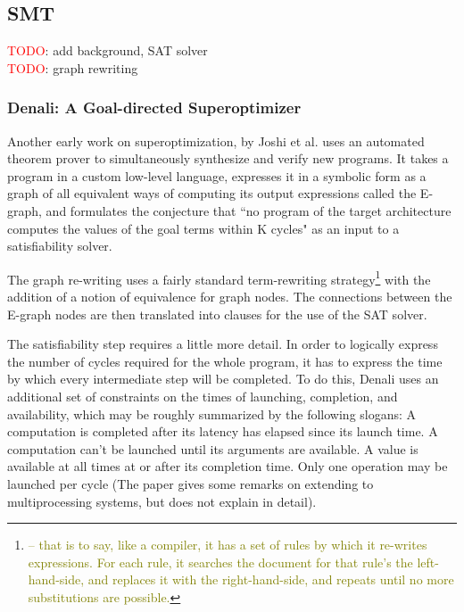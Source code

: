 \documentclass[12pt,twoside]{reedthesis}
\newcommand{\red}[1]{\textcolor{red}{#1}}
\newcommand{\green}[1]{\textcolor{olive}{#1}}
\newcommand{\addressed}[2]{{#1}}
\begin{document}
\subsection{SMT}
    \red{TODO}: add background, SAT solver
\\  \red{TODO}: graph rewriting

\subsubsection{Denali: A Goal-directed Superoptimizer}
Another early work on superoptimization, by Joshi et al. \cite{joshi2002denali} uses an automated theorem prover to simultaneously synthesize and verify new programs.
It takes a program in a custom low-level language, expresses it in a symbolic form as a graph of all equivalent ways of computing its output expressions
    \addressed{called the E-graph}{I would be inclined to have a separate description of E-graphs, but it depends on the structure of the section},
    and formulates the conjecture that ``no program of the target architecture computes the values of the goal terms within K cycles"
        \addressed{as an input to a satisfiability solver}{I would reorganize slightly so that this comes right before the explanation below}. 
    
The \addressed{graph re-writing}{introduce graph rewriting}
uses a fairly standard term-rewriting strategy\footnote{\green{-- that is to say, like a compiler, it has a set of rules by which it re-writes expressions. For each rule, it searches the document for that rule's the left-hand-side, and replaces it with the right-hand-side, and repeats until no more substitutions are possible.}}
with the addition of a notion of equivalence for graph nodes.
The connections between the E-graph nodes are then translated into clauses for the use of the SAT solver.
    
The satisfiability step requires a little more detail.
In order to logically express the number of cycles required for the whole program, it has to express the time by which every intermediate step will be completed.
To do this, Denali uses an additional set of constraints on the times of launching, completion, and availability, which may be roughly summarized by the following slogans:
    A computation is completed after its latency has elapsed since its launch time.
    A computation can't be launched until its arguments are available.
    A value is available at all times at or after its completion time.
    Only one operation may be launched per cycle (The paper gives some remarks on extending to multiprocessing systems, but does not explain in detail).
    
\end{document}
